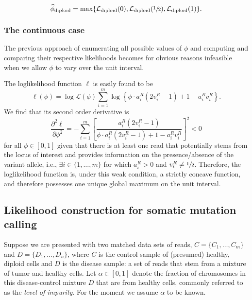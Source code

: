 \documentclass[a4paper,12pt]{article}
\begin{document}
\begin{equation}
 \widehat{\phi}_\text{diploid} = \text{max} \{ \mathcal{L}_\text{diploid}(0), \mathcal{L}_\text{diploid}(\sfrac{1}{2}), \mathcal{L}_\text{diploid}(1) \}. 
\end{equation}

\subsubsection{The continuous case}
The previous approach of enumerating all possible values of $\phi$ and computing and comparing their respective likelihoods becomes for obvious reasons infeasible when we allow $\phi$ to vary over the unit interval. 

The loglikelihood function $\ell$ is easily found to be 
\begin{equation}
 \ell(\phi) = \log \mathcal{L}(\phi) \sum_{i = 1}^m \log \left\{\phi \cdot  a_i^R\left(2 v_i^R - 1 \right) + 1 - a_i^R v_i^R \right\}.  
\end{equation}
We find that its second order derivative is
\begin{equation}
 \frac{\partial^2 \ell}{\partial \phi^2} = - \sum_{i = 1}^m \left [ \frac{a_i^R \left(2 v_i^R - 1\right)}{\phi \cdot a_i^R \left(2 v_i^R - 1\right) + 1 - a_i^R v_i^R }\right]^2 < 0
\end{equation}
for all $\phi \in [0,1]$ given that there is at least one read that potentially stems from the locus of interest and provides information on the presence/absence of the variant allele, i.e., $\exists i \in \{1, \dots, m\}$ for which $a_i^R > 0$ and $v_i^R \neq \sfrac{1}{2}$. Therefore, the loglikelihood function is, under this weak condition, a strictly concave function, and therefore possesses one unique global maximum on the unit interval. 




\subsection{Likelihood construction for somatic mutation calling}

Suppose we are presented with two matched data sets of reads, $C = \{C_1, \dots, C_m\}$ and $D = \{D_1, \dots, D_n\}$, where $C$ is the control sample of (presumed) healthy, diploid cells and $D$ is the disease sample: a set of reads that stem from a mixture of tumor and healthy cells. Let $\alpha \in [0,1]$ denote the fraction of chromosomes in this disease-control mixture $D$ that are from healthy cells, commonly referred to as the \emph{level of impurity}. For the moment we assume $\alpha$ to be known. 
\end{document}
